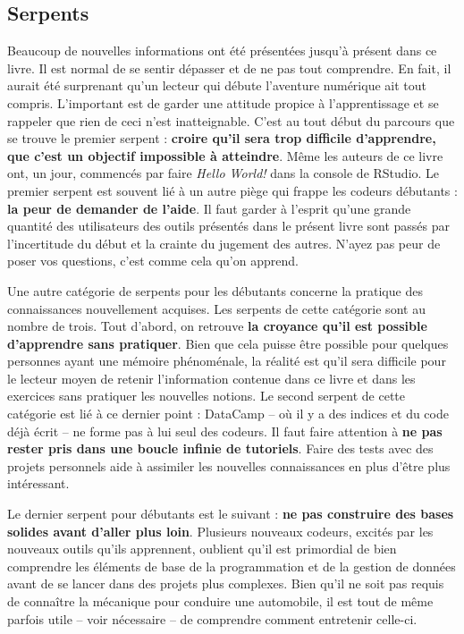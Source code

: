 \documentclass[
  letterpaper,
]{scrbook}
\begin{document}
\hypertarget{serpents}{%
\subsection{Serpents}\label{serpents}}

Beaucoup de nouvelles informations ont été présentées jusqu'à présent
dans ce livre. Il est normal de se sentir dépasser et de ne pas tout
comprendre. En fait, il aurait été surprenant qu'un lecteur qui débute
l'aventure numérique ait tout compris. L'important est de garder une
attitude propice à l'apprentissage et se rappeler que rien de ceci n'est
inatteignable. C'est au tout début du parcours que se trouve le premier
serpent : \textbf{croire qu'il sera trop difficile d'apprendre, que
c'est un objectif impossible à atteindre}. Même les auteurs de ce livre
ont, un jour, commencés par faire \emph{Hello World!} dans la console de
RStudio. Le premier serpent est souvent lié à un autre piège qui frappe
les codeurs débutants : \textbf{la peur de demander de l'aide}. Il faut
garder à l'esprit qu'une grande quantité des utilisateurs des outils
présentés dans le présent livre sont passés par l'incertitude du début
et la crainte du jugement des autres. N'ayez pas peur de poser vos
questions, c'est comme cela qu'on apprend.

Une autre catégorie de serpents pour les débutants concerne la pratique
des connaissances nouvellement acquises. Les serpents de cette catégorie
sont au nombre de trois. Tout d'abord, on retrouve \textbf{la croyance
qu'il est possible d'apprendre sans pratiquer}. Bien que cela puisse
être possible pour quelques personnes ayant une mémoire phénoménale, la
réalité est qu'il sera difficile pour le lecteur moyen de retenir
l'information contenue dans ce livre et dans les exercices sans
pratiquer les nouvelles notions. Le second serpent de cette catégorie
est lié à ce dernier point : DataCamp -- où il y a des indices et du
code déjà écrit -- ne forme pas à lui seul des codeurs. Il faut faire
attention à \textbf{ne pas rester pris dans une boucle infinie de
tutoriels}. Faire des tests avec des projets personnels aide à assimiler
les nouvelles connaissances en plus d'être plus intéressant.

Le dernier serpent pour débutants est le suivant : \textbf{ne pas
construire des bases solides avant d'aller plus loin}. Plusieurs
nouveaux codeurs, excités par les nouveaux outils qu'ils apprennent,
oublient qu'il est primordial de bien comprendre les éléments de base de
la programmation et de la gestion de données avant de se lancer dans des
projets plus complexes. Bien qu'il ne soit pas requis de connaître la
mécanique pour conduire une automobile, il est tout de même parfois
utile -- voir nécessaire -- de comprendre comment entretenir celle-ci.
\end{document}
